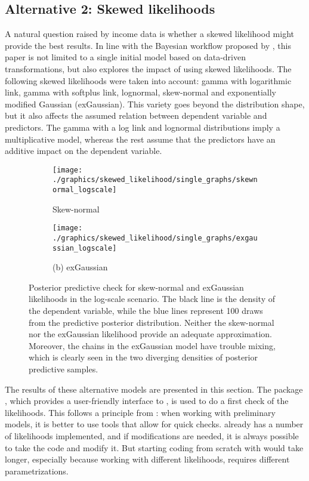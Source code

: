 \subsection{Alternative 2: Skewed likelihoods}
\label{ch:skewed_likelihoods}
A natural question raised by income data is whether a skewed likelihood might provide the best results.
In line with the Bayesian workflow proposed by \cite{gelman_bayesian_2020}, this paper is not limited to a single initial model based on data-driven transformations, but also explores the impact of using skewed likelihoods.
The following skewed likelihoods were taken into account: gamma with logarithmic link, gamma with
softplus link, lognormal, skew-normal and exponentially modified Gaussian (exGaussian).
This variety goes beyond the distribution shape, but it also affects the assumed relation between dependent variable and predictors.
The gamma with a log link and lognormal distributions imply a multiplicative model, whereas the rest assume that the predictors have an additive impact on the dependent variable.

\begin{figure}[h]
    \centering
    \begin{subfigure}{0.45\linewidth}
        \centering
        \texttt{[image: ./graphics/skewed\_likelihood/single\_graphs/skewnormal\_logscale]}
        \caption{Skew-normal}
        \label{fig:logscale_skewnormal}
    \end{subfigure}
    \begin{subfigure}{0.45\linewidth}
        \centering
        \texttt{[image: ./graphics/skewed\_likelihood/single\_graphs/exgaussian\_logscale]}
        \caption{(b) exGaussian}
        \label{fig:logscale_exgaussian}
    \end{subfigure}

    \caption[Posterior predictive check for skew-normal and exGaussian likelihoods.]{Posterior predictive check for skew-normal and exGaussian likelihoods  in the log-scale scenario. The black line is the density of the dependent variable, while the blue lines represent 100 draws from the predictive posterior distribution. Neither the skew-normal nor the exGaussian likelihood provide an adequate approximation. Moreover, the chains in the exGaussian model have trouble mixing, which is clearly seen in the two diverging densities of posterior predictive samples.}
    \label{fig:logscale_misfit}
\end{figure}

The results of these alternative models are presented in this section.
The package  \citep{burkner_brms_2017}, which provides a user-friendly interface to , is used to do a first check of the likelihoods.
This follows a principle from \cite{gelman_bayesian_2020}: when working with preliminary models, it is better to use tools that allow for quick checks.
 already has a number of likelihoods implemented, and if modifications are needed, it is always possible to take the  code and modify it.
But starting coding from scratch with  would take longer, especially because working with different likelihoods, requires different parametrizations.

